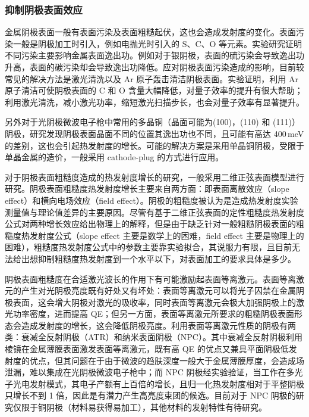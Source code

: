 \subsubsection{抑制阴极表面效应}
金属阴极表面一般有表面污染及表面粗糙起伏，这也会造成发射度的变化。表面污染一般是阴极加工时引入，例如电抛光时引入的 S、C、O 等元素。实验研究证明不同污染主要影响金属表面逸出功\cite{Chelvayohan:1982aa,Opower:2006aa,Valizadeh:2013aa}。例如对于银阴极，表面的硫污染会导致逸出功升高，表面的碳污染却会导致逸出功降低\cite{Chelvayohan:1982aa}。应对阴极表面污染造成的影响，目前较常见的解决方法是激光清洗\cite{Brachmann:2011aa}以及 Ar 原子轰击清洁阴极表面\cite{Chelvayohan:1982aa,Valizadeh:2013aa}。实验证明，利用 Ar 原子清洁可使阴极表面的 C 和 O 含量大幅降低，对量子效率的提升有很大帮助\cite{Valizadeh:2013aa}；利用激光清洗，减小激光功率，缩短激光扫描步长，也会对量子效率有显著提升\cite{Brachmann:2011aa}。

另外对于光阴极微波电子枪中常用的多晶铜（晶面可能为(100)，(110) 和 (111)）阴极，研究发现阴极表面晶面不同的位置其逸出功也不同，且可能有高达 400\,meV 的差别\cite{Renault:2006aa}，这也会引起热发射度的增长。可能的解决方案是采用单晶铜阴极，受限于单晶金属的造价，一般采用 cathode-plug 的方式进行应用\cite{Ganter:2013aa}。

对于阴极表面粗糙度造成的热发射度增长的研究，一般采用二维正弦表面模型进行研究\cite{He:2004aa,Krasilnikov:2006aa,Karkare:2011aa}。阴极表面粗糙度热发射度增长主要来自两方面：即表面离散效应（slope effect）和横向电场效应（field effect）\cite{Bradley:1977aa}。阴极的粗糙度被认为是造成热发射度实验测量值与理论值差异的主要原因\cite{qian2012experimental,Vecchione:2012aa,schubert2013bi}。尽管有基于二维正弦表面的定性粗糙度热发射度公式对两种增长效应给出物理上的解释，但是由于缺乏针对一般粗糙阴极表面的粗糙度热发射度公式（slope effect 主要是数学上的困难，field effect 主要是物理上的困难），粗糙度热发射度公式中的参数主要靠实验拟合，其说服力有限，且目前无法给出想抑制粗糙度热发射度到一个水平以下，对表面加工的要求具体是多少。

阴极表面粗糙度在合适激光波长的作用下有可能激励起表面等离激元\cite{Novotny:2012aa}。表面等离激元的产生对光阴极亮度既有好处又有坏处：表面等离激元可以将光子囚禁在金属阴极表面，这会增大阴极对激光的吸收率，同时表面等离激元会极大加强阴极上的激光功率密度，进而提高 QE；但另一方面，表面等离激元所要求的粗糙阴极表面形态会造成发射度的增长，这会降低阴极亮度。利用表面等离激元性质的阴极有两类：衰减全反射阴极（ATR）和纳米表面阴极（NPC）。其中衰减全反射阴极利用棱镜在金属薄膜表面激发表面等离激元，既有高 QE 的优点又兼具平面阴极低发射度的优点，但其问题在于由于微波的趋肤深度一般大于金属薄膜厚度，会造成场泄漏，难以集成在光阴极微波电子枪中\cite{Watanabe:2011aa,Neo:2012aa}；而 NPC 阴极经实验验证，当工作在多光子光电发射模式\cite{Musumeci:2010aa}，其电子产额有上百倍的增长，且归一化热发射度相对于平整阴极只增长不到 1 倍\cite{Polyakov:2013ab,Li:2013ac}，因此是有潜力产生高亮度束团的候选。目前对于 NPC 阴极的研究仅限于铜阴极（材料易获得易加工），其他材料的发射特性有待研究。

